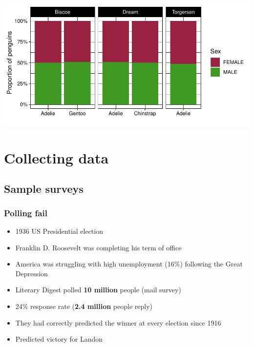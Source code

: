 \documentclass[a4paper]{article}
\begin{document}
\begin{Schunk}


{\centering \includegraphics[width=\maxwidth]{figure/listings-unnamed-chunk-11-1} 

}

\end{Schunk}
\section{Collecting data}\label{sec:2}
\subsection{Sample surveys}
\subsubsection{Polling fail}
\begin{itemize}
    \item 1936 US Presidential election
    \item Franklin D. Roosevelt was completing his term of office
    \item America was struggling with high unemployment (16\%) following the Great Depression
    \item Literary Digest polled \textbf{10 million} people (mail survey)
    \item 24\% response rate (\textbf{2.4 million} people reply)
    \item They had correctly predicted the winner at every election since 1916
    \item Predicted victory for \textcolor{myred}{Landon}
\end{itemize}
\end{document}
